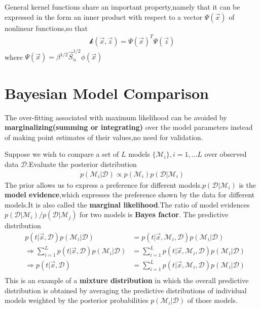 General kernel functions share an important property,namely that it can be expressed in the form an inner product with respect to a vector $\varPsi(\vec{x}) $ of nonlinear functions,so that
\begin{align}
\mathcal{k}(\vec{x},\vec{z}) = \varPsi(\vec{x})^T\varPsi(\vec{z})
\end{align}
where $\varPsi(\vec{x})=\beta^{1/2}\vec{S}_n^{1/2}\phi(\vec{x})$

\section{Bayesian Model Comparison}
The over-fitting associated with maximum likelihood can be avoided by \textbf{marginalizing(summing or integrating)} over the model parameters instead of making point estimates of their values,no need for validation.

Suppose we wish to compare a set of $L$ models $\{\mathcal{M}_i\},i=1,...L$ over observed data $\mathcal{D}$.Evaluate the posterior distribution
\begin{align}
p(\mathcal{M}_i|\mathcal{D})\propto p(\mathcal{M}_i)p(\mathcal{D}|\mathcal{M}_i)
\end{align}
The prior allows us to express a preference for different models.$p(\mathcal{D}|\mathcal{M}_i)$ is the \textbf{model evidence},which expresses the preference shown by the data for different models.It is also called the \textbf{marginal likelihood}.The ratio of model evidences $p(\mathcal{D}|\mathcal{M}_i)/p(\mathcal{D}|\mathcal{M}_j)$ for two models is \textbf{Bayes factor}.
The predictive distribution
\begin{align}
& p(t|\vec{x},\mathcal{D})p(\mathcal{M}_i|\mathcal{D})&=p(t|\vec{x},\mathcal{M}_i,\mathcal{D})p(\mathcal{M}_i|\mathcal{D}) \\
&\Rightarrow \sum\limits_{i=1}^{L}p(t|\vec{x},\mathcal{D})p(\mathcal{M}_i|\mathcal{D})&=\sum\limits_{i=1}^{L}p(t|\vec{x},\mathcal{M}_i,\mathcal{D})p(\mathcal{M}_i|\mathcal{D}) \\
&\Rightarrow p(t|\vec{x},\mathcal{D})&=\sum\limits_{i=1}^{L}p(t|\vec{x},\mathcal{M}_i,\mathcal{D})p(\mathcal{M}_i|\mathcal{D}) \\
\end{align}
This is an example of a \textbf{mixture distribution} in which the overall predictive distribution is obtained by averaging the predictive distributions of individual models weighted by the posterior probabilities $p(\mathcal{M}_i|\mathcal{D})$ of those models.

